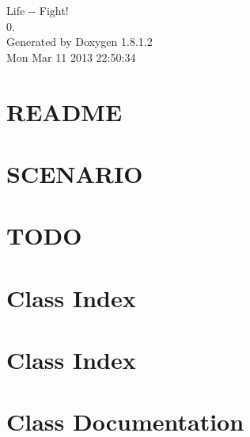 \documentclass{article}
\begin{document}
\hypersetup{pageanchor=false,citecolor=blue}
\begin{titlepage}
\vspace*{7cm}
\begin{center}
{\Large Life -\/-\/ Fight! \\[1ex]\large 0. }\\
\vspace*{1cm}
{\large Generated by Doxygen 1.8.1.2}\\
\vspace*{0.5cm}
{\small Mon Mar 11 2013 22:50:34}\\
\end{center}
\end{titlepage}
\tableofcontents
{}
\hypersetup{pageanchor=true,citecolor=blue}
\section{R\-E\-A\-D\-M\-E}
\label{md_README}
\hypertarget{md_README}{}

\section{S\-C\-E\-N\-A\-R\-I\-O}
\label{md_SCENARIO}
\hypertarget{md_SCENARIO}{}

\section{T\-O\-D\-O}
\label{md_TODO}
\hypertarget{md_TODO}{}

\section{Class Index}

\section{Class Index}

\section{Class Documentation}


\printindex
\end{document}
